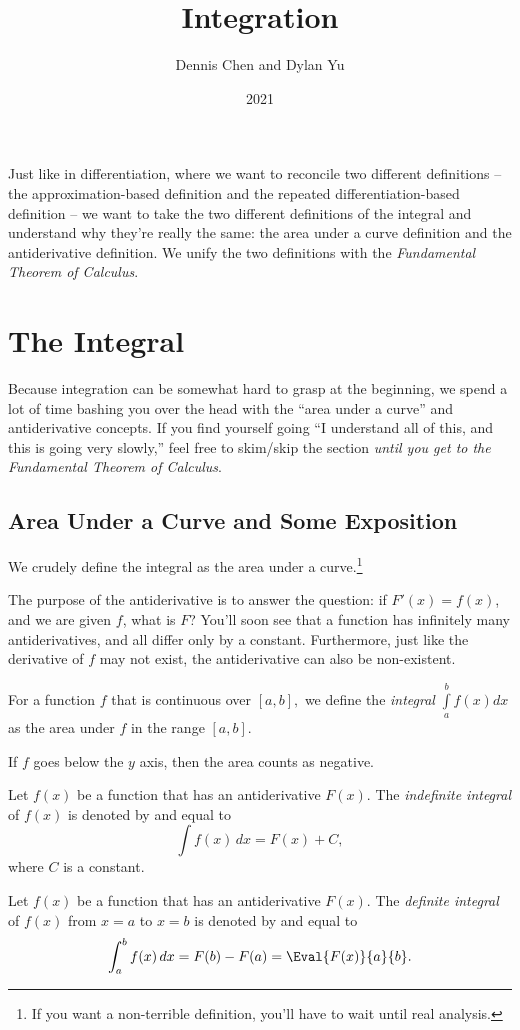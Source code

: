 \documentclass[mast]{lucky}
\title{Integration}
\author{Dennis Chen and Dylan Yu}
\date{2021}
\begin{document}
\maketitle

Just like in differentiation, where we want to reconcile two different definitions -- the approximation-based definition and the repeated differentiation-based definition -- we want to take the two different definitions of the integral and understand why they're really the same: the area under a curve definition and the antiderivative definition. We unify the two definitions with the \emph{Fundamental Theorem of Calculus}.

\section{The Integral}

Because integration can be somewhat hard to grasp at the beginning, we spend a lot of time bashing you over the head with the ``area under a curve'' and antiderivative concepts. If you find yourself going ``I understand all of this, and this is going very slowly,'' feel free to skim/skip the section \emph{until you get to the Fundamental Theorem of Calculus}.

\subsection{Area Under a Curve and Some Exposition}

We crudely define the integral as the area under a curve.\footnote{If you want a non-terrible definition, you'll have to wait until real analysis.}

The purpose of the antiderivative is to answer the question: if $F'(x)=f(x)$, and we are given $f$, what is $F$? You'll soon see that a function has infinitely many antiderivatives, and all differ only by a constant. Furthermore, just like the derivative of $f$ may not exist, the antiderivative can also be non-existent.

\begin{defi}[Integral]
For a function $f$ that is continuous over $[a,b],$ we define the \emph{integral} $\int\limits_{a}^{b}f(x)dx$ as the area under $f$ in the range $[a,b].$

If $f$ goes below the $y$ axis, then the area counts as negative.
\end{defi}

\begin{defi}
Let $f(x)$ be a function that has an antiderivative $F(x)$. The \emph{indefinite integral} of $f(x)$ is denoted by and equal to
$$\int f(x)\,dx = F(x)+C,$$
where $C$ is a constant.
\end{defi}
\begin{defi}
Let $f(x)$ be a function that has an antiderivative $F(x)$. The \emph{definite integral} of $f(x)$ from $x=a$ to $x=b$ is denoted by and equal to
$$\int_a^b f(x)\, dx=F(b)-F(a)=\Eval{F(x)}{a}{b}.$$
\end{defi}
\end{document}

